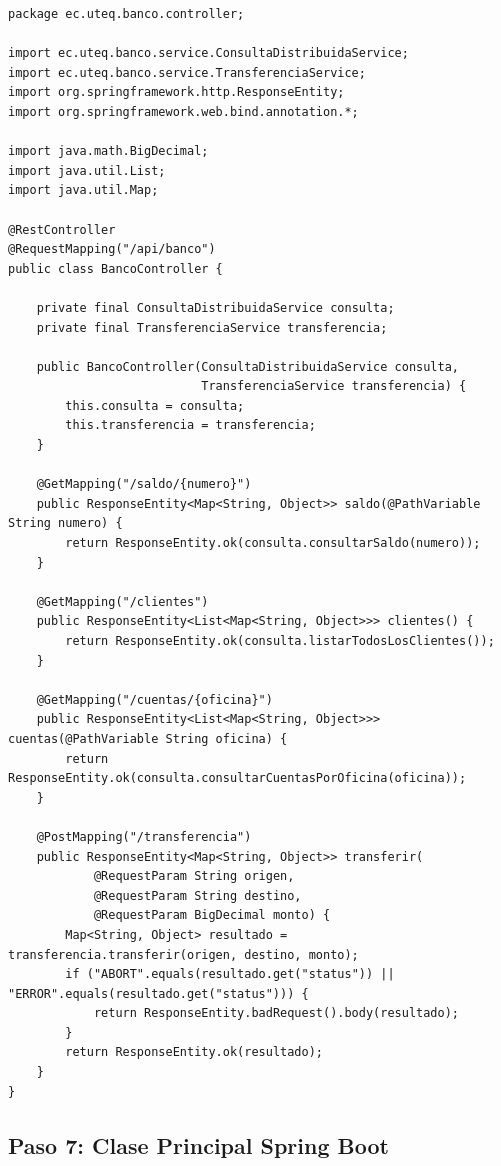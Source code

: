 \documentclass[11pt,a4paper]{article}
\begin{document}
\begin{lstlisting}[style=JavaStyle,caption={BancoController.java: endpoints de consulta y transferencia}]
package ec.uteq.banco.controller;

import ec.uteq.banco.service.ConsultaDistribuidaService;
import ec.uteq.banco.service.TransferenciaService;
import org.springframework.http.ResponseEntity;
import org.springframework.web.bind.annotation.*;

import java.math.BigDecimal;
import java.util.List;
import java.util.Map;

@RestController
@RequestMapping("/api/banco")
public class BancoController {

    private final ConsultaDistribuidaService consulta;
    private final TransferenciaService transferencia;

    public BancoController(ConsultaDistribuidaService consulta,
                           TransferenciaService transferencia) {
        this.consulta = consulta;
        this.transferencia = transferencia;
    }

    @GetMapping("/saldo/{numero}")
    public ResponseEntity<Map<String, Object>> saldo(@PathVariable String numero) {
        return ResponseEntity.ok(consulta.consultarSaldo(numero));
    }

    @GetMapping("/clientes")
    public ResponseEntity<List<Map<String, Object>>> clientes() {
        return ResponseEntity.ok(consulta.listarTodosLosClientes());
    }

    @GetMapping("/cuentas/{oficina}")
    public ResponseEntity<List<Map<String, Object>>> cuentas(@PathVariable String oficina) {
        return ResponseEntity.ok(consulta.consultarCuentasPorOficina(oficina));
    }

    @PostMapping("/transferencia")
    public ResponseEntity<Map<String, Object>> transferir(
            @RequestParam String origen,
            @RequestParam String destino,
            @RequestParam BigDecimal monto) {
        Map<String, Object> resultado = transferencia.transferir(origen, destino, monto);
        if ("ABORT".equals(resultado.get("status")) || "ERROR".equals(resultado.get("status"))) {
            return ResponseEntity.badRequest().body(resultado);
        }
        return ResponseEntity.ok(resultado);
    }
}
\end{lstlisting}

\subsection{Paso 7: Clase Principal Spring Boot}
\end{document}
